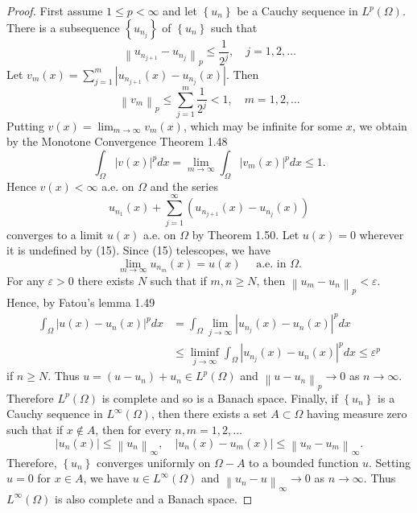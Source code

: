 \begin{proof}
  First assume $1 \leq p<\infty$ and let $\left\{u_n\right\}$ be a Cauchy sequence in $L^p(\Omega)$. There is a subsequence $\left\{u_{n_j}\right\}$ of $\left\{u_n\right\}$ such that
  \[
  \left\|u_{n_{j+1}}-u_{n_j}\right\|_p \leq \frac{1}{2^j}, \quad j=1,2, \ldots
  \]
  Let $v_m(x)=\sum_{j=1}^m\left|u_{n_{j+1}}(x)-u_{n_j}(x)\right|$. Then
  \[
  \left\|v_m\right\|_p \leq \sum_{j=1}^m \frac{1}{2^j}<1, \quad m=1,2, \ldots
  \]
  Putting $v(x)=\lim _{m \rightarrow \infty} v_m(x)$, which may be infinite for some $x$, we obtain by the Monotone Convergence Theorem 1.48
  \[
  \int_{\Omega}|v(x)|^p d x=\lim _{m \rightarrow \infty} \int_{\Omega}\left|v_m(x)\right|^p d x \leq 1 .
  \]
  Hence $v(x)<\infty$ a.e. on $\Omega$ and the series
  \begin{equation}\label{eq:2.15}
  u_{n_1}(x)+\sum_{j=1}^{\infty}\left(u_{n_{j+1}}(x)-u_{n_j}(x)\right)
  \end{equation}
  converges to a limit $u(x)$ a.e. on $\Omega$ by Theorem 1.50. Let $u(x)=0$ wherever it is undefined by (15). Since (15) telescopes, we have
  \[
  \lim _{m \rightarrow \infty} u_{n_m}(x)=u(x) \quad \text { a.e. in } \Omega.
  \]
  For any $\varepsilon>0$ there exists $N$ such that if $m, n \geq N$, then $\left\|u_m-u_n\right\|_p<\varepsilon$. Hence, by Fatou's lemma 1.49
  \[
  \begin{aligned}
  \int_{\Omega}\left|u(x)-u_n(x)\right|^p d x & =\int_{\Omega} \lim _{j \rightarrow \infty}\left|u_{n_j}(x)-u_n(x)\right|^p d x \\
  & \leq \liminf _{j \rightarrow \infty} \int_{\Omega}\left|u_{n_j}(x)-u_n(x)\right|^p d x \leq \varepsilon^p
  \end{aligned}
  \]
  if $n \geq N$. Thus $u=\left(u-u_n\right)+u_n \in L^p(\Omega)$ and $\left\|u-u_n\right\|_p \rightarrow 0$ as $n \rightarrow \infty$. Therefore $L^p(\Omega)$ is complete and so is a Banach space.
  Finally, if $\left\{u_n\right\}$ is a Cauchy sequence in $L^{\infty}(\Omega)$, then there exists a set $A \subset \Omega$ having measure zero such that if $x \notin A$, then for every $n, m=1,2, \ldots$
  \[
  \left|u_n(x)\right| \leq\left\|u_n\right\|_{\infty}, \quad\left|u_n(x)-u_m(x)\right| \leq\left\|u_n-u_m\right\|_{\infty} .
  \]
  Therefore, $\left\{u_n\right\}$ converges uniformly on $\Omega-A$ to a bounded function $u$. Setting $u=0$ for $x \in A$, we have $u \in L^{\infty}(\Omega)$ and $\left\|u_n-u\right\|_{\infty} \rightarrow 0$ as $n \rightarrow \infty$. Thus $L^{\infty}(\Omega)$ is also complete and a Banach space.
\end{proof}

